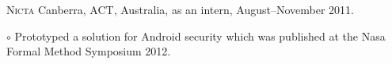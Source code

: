 \documentclass[letterpaper]{article}
\renewenvironment{itemize}{
  \begin{list}{}{
    \setlength{\leftmargin}{1.5em}
  }
}{
  \end{list}
}
\newenvironment{itemize1}{
  \begin{list}{}{
    \setlength{\leftmargin}{0em}
  }
}{
  \end{list}
}
\begin{document}
\begin{itemize}
\begin{itemize}
\end{itemize}
\item \textsc{Nicta} Canberra, ACT, Australia, as an intern, August--November 2011. 
\begin{itemize}
	\item $\circ$ Prototyped a solution for Android security which was published at the Nasa Formal Method Symposium 2012.
\end{itemize}
\end{itemize}


\end{document}
